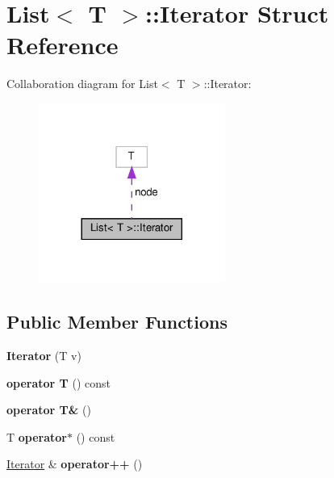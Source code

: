 \hypertarget{structList_1_1Iterator}{}\section{List$<$ T $>$\+:\+:Iterator Struct Reference}
\label{structList_1_1Iterator}


Collaboration diagram for List$<$ T $>$\+:\+:Iterator\+:\nopagebreak
\begin{figure}[H]
\begin{center}
\leavevmode
\includegraphics[width=173pt]{da/dcb/structList_1_1Iterator__coll__graph}
\end{center}
\end{figure}
\subsection*{Public Member Functions}
\begin{DoxyCompactItemize}
\item 
\mbox{\label{structList_1_1Iterator_a94bfb6df7d896c67b445d87b123aefd3}} 
{\bfseries Iterator} (T v)
\item 
\mbox{\label{structList_1_1Iterator_a25714263a7e0bae6586bbc9edbf47248}} 
{\bfseries operator T} () const
\item 
\mbox{\label{structList_1_1Iterator_a64fb726068223f4636be78b3e7296e1b}} 
{\bfseries operator T\&} ()
\item 
\mbox{\label{structList_1_1Iterator_a212b4cd6a7c78ec53000526da0270fcd}} 
T {\bfseries operator$\ast$} () const
\item 
\mbox{\label{structList_1_1Iterator_a6c0a5a93fe84d4e045ad0256179fc039}} 
\hyperlink{structList_1_1Iterator}{Iterator} \& {\bfseries operator++} ()
\end{DoxyCompactItemize}
